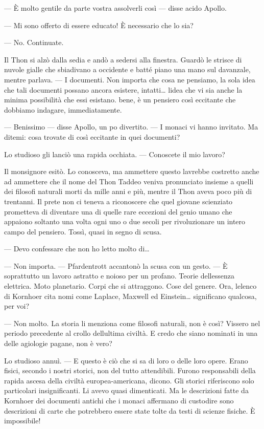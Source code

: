 	--- È molto gentile da parte vostra assolverli così --- disse acido
	Apollo.
	
	--- Mi sono offerto di essere educato! È necessario che lo sia?
	
	--- No. Continuate.
	
	Il Thon si alzò dalla sedia e andò a sedersi alla finestra. Guardò le
	strisce di nuvole gialle che sbiadivano a occidente e batté piano una
	mano sul davanzale, mentre parlava. --- I documenti. Non importa che
	cosa ne pensiamo, la sola idea che tali documenti possano ancora
	esistere, intatti\ldots{} l\textquotesingle idea che vi sia anche la
	minima possibilità che essi esistano. bene, è un pensiero così eccitante
	che dobbiamo indagare, immediatamente.
	
	--- Benissimo --- disse Apollo, un po\textquotesingle{} divertito. --- I
	monaci vi hanno invitato. Ma ditemi: cosa trovate di così eccitante in
	quei documenti?
	
	Lo studioso gli lanciò una rapida occhiata. --- Conoscete il mio lavoro?
	
	Il monsignore esitò. Lo conosceva, ma ammettere questo
	l\textquotesingle avrebbe costretto anche ad ammettere che il nome del
	Thon Taddeo veniva pronunciato insieme a quelli dei filosofi naturali
	morti da mille anni e più, mentre il Thon aveva poco più di
	trent\textquotesingle anni. Il prete non ci teneva a riconoscere che
	quel giovane scienziato prometteva di diventare una di quelle rare
	eccezioni del genio umano che appaiono soltanto una volta ogni uno o due
	secoli per rivoluzionare un intero campo del pensiero. Tossì, quasi in
	segno di scusa.
	
	--- Devo confessare che non ho letto molto di\ldots{}
	
	--- Non importa. --- Pfardentrott accantonò la scusa con un gesto. --- È
	soprattutto un lavoro astratto e noioso per un profano. Teorie
	dell\textquotesingle essenza elettrica. Moto planetario. Corpi che si
	attraggono. Cose del genere. Ora, l\textquotesingle elenco di Kornhoer
	cita nomi come Laplace, Maxwell ed Einstein\ldots{} significano
	qualcosa, per voi?
	
	--- Non molto. La storia li menziona come filosofi naturali, non è così?
	Vissero nel periodo precedente al crollo dell\textquotesingle ultima
	civiltà. E credo che siano nominati in una delle agiologie pagane, non è
	vero?
	
	Lo studioso annuì. --- E questo è ciò che si sa di loro o delle loro
	opere. Erano fisici, secondo i nostri storici, non del tutto
	attendibili. Furono responsabili della rapida ascesa della civiltà
	europea-americana, dicono. Gli storici riferiscono solo particolari
	insignificanti. Li avevo quasi dimenticati. Ma le descrizioni fatte da
	Kornhoer dei documenti antichi che i monaci affermano di custodire sono
	descrizioni di carte che potrebbero essere state tolte da testi di
	scienze fisiche. È impossibile!
	
